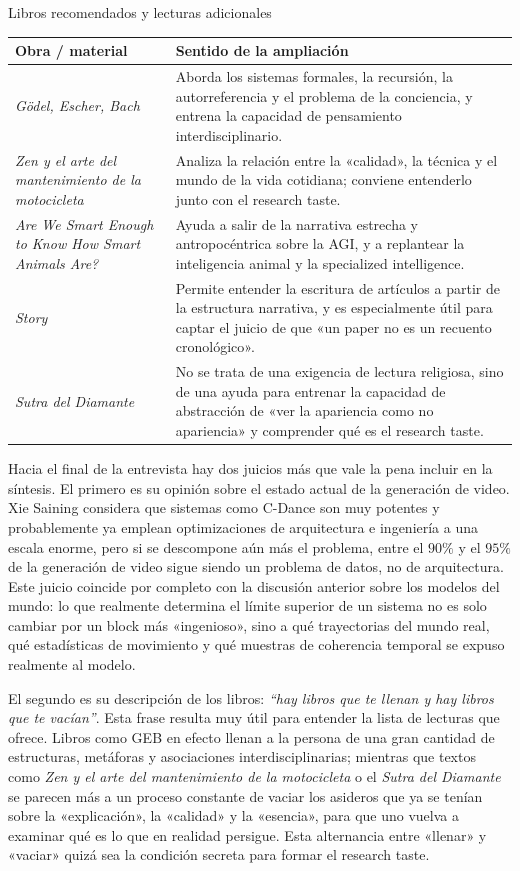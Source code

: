 \begin{knowledgebox}{Libros recomendados y lecturas adicionales}
\begin{tabularx}{\textwidth}{>{\raggedright\arraybackslash}p{} Y}
\toprule
Obra / material & Sentido de la ampliación \\
\midrule
\textit{Gödel, Escher, Bach} & Aborda los sistemas formales, la recursión, la autorreferencia y el problema de la conciencia, y entrena la capacidad de pensamiento interdisciplinario. \\
\textit{Zen y el arte del mantenimiento de la motocicleta} & Analiza la relación entre la «calidad», la técnica y el mundo de la vida cotidiana; conviene entenderlo junto con el research taste. \\
\textit{Are We Smart Enough to Know How Smart Animals Are?} & Ayuda a salir de la narrativa estrecha y antropocéntrica sobre la AGI, y a replantear la inteligencia animal y la specialized intelligence. \\
\textit{Story} & Permite entender la escritura de artículos a partir de la estructura narrativa, y es especialmente útil para captar el juicio de que «un paper no es un recuento cronológico». \\
\textit{Sutra del Diamante} & No se trata de una exigencia de lectura religiosa, sino de una ayuda para entrenar la capacidad de abstracción de «ver la apariencia como no apariencia» y comprender qué es el research taste. \\
\bottomrule
\end{tabularx}
\end{knowledgebox}

Hacia el final de la entrevista hay dos juicios más que vale la pena incluir en la síntesis. El primero es su opinión sobre el estado actual de la generación de video. Xie Saining considera que sistemas como C-Dance son muy potentes y probablemente ya emplean optimizaciones de arquitectura e ingeniería a una escala enorme, pero si se descompone aún más el problema, entre el \(90\%\) y el \(95\%\) de la generación de video sigue siendo un problema de datos, no de arquitectura. Este juicio coincide por completo con la discusión anterior sobre los modelos del mundo: lo que realmente determina el límite superior de un sistema no es solo cambiar por un block más «ingenioso», sino a qué trayectorias del mundo real, qué estadísticas de movimiento y qué muestras de coherencia temporal se expuso realmente al modelo.

El segundo es su descripción de los libros: \textit{``hay libros que te llenan y hay libros que te vacían''}. Esta frase resulta muy útil para entender la lista de lecturas que ofrece. Libros como GEB en efecto llenan a la persona de una gran cantidad de estructuras, metáforas y asociaciones interdisciplinarias; mientras que textos como \textit{Zen y el arte del mantenimiento de la motocicleta} o el \textit{Sutra del Diamante} se parecen más a un proceso constante de vaciar los asideros que ya se tenían sobre la «explicación», la «calidad» y la «esencia», para que uno vuelva a examinar qué es lo que en realidad persigue. Esta alternancia entre «llenar» y «vaciar» quizá sea la condición secreta para formar el research taste.


